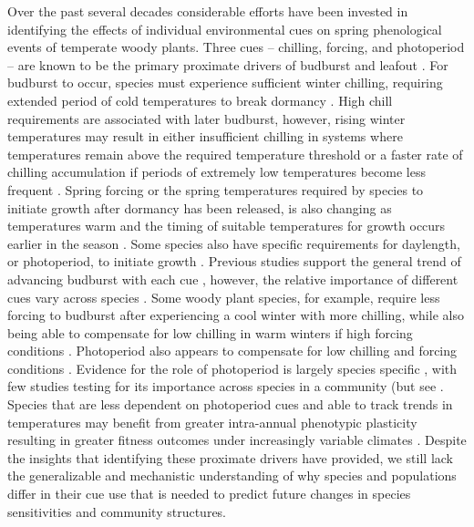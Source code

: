 \documentclass{article}\usepackage[]{graphicx}\usepackage[]{color}
\begin{document}
Over the past several decades considerable efforts have been invested in identifying the effects of individual environmental cues on spring phenological events of temperate woody plants. Three cues -- chilling, forcing, and photoperiod -- are known to be the primary proximate drivers of budburst and leafout \citep{Chuine2016}. For budburst to occur, species must experience sufficient winter chilling, requiring extended period of cold temperatures to break dormancy \citep{Cooke2012, Ritchie2003}. High chill requirements are associated with later budburst, however, rising winter temperatures may result in either insufficient chilling in systems where temperatures remain above the required temperature threshold or a faster rate of chilling accumulation if periods of extremely low temperatures become less frequent \citep{Guy2014}. Spring forcing or the spring temperatures required by species to initiate growth after dormancy has been released, is also changing as temperatures warm and the timing of suitable temperatures for growth occurs earlier in the season \citep{citation}. Some species also have specific requirements for daylength, or photoperiod, to initiate growth \citep{}. Previous studies support the general trend of advancing budburst with each cue \citep{Flynn2018}, however, the relative importance of different cues vary across species \citep{Chuine2016?, citations}. Some woody plant species, for example, require less forcing to budburst after experiencing a cool winter with more chilling, while also being able to compensate for low chilling in warm winters if high forcing conditions \citep{Laube2014, Harrington2015}. Photoperiod also appears to compensate for low chilling and forcing conditions  \citep{Flynn2018,  Caffarra2011, Basler2014,  Zohner2016}. Evidence for the role of photoperiod is largely species specific  \citep{Heide1993, Basler2014, Singh2017, Zohner2016}, with few studies testing for its importance across species in a community (but see  \citep{Flynn2018}. Species that are less dependent on photoperiod cues and able to track trends in temperatures may benefit from greater intra-annual phenotypic plasticity resulting in greater fitness outcomes under increasingly variable climates \citep{citation}. Despite the insights that identifying these proximate drivers have provided, we still lack the generalizable and mechanistic understanding of why species and populations differ in their cue use that is needed to predict future changes in species sensitivities and community structures.
\end{document}
